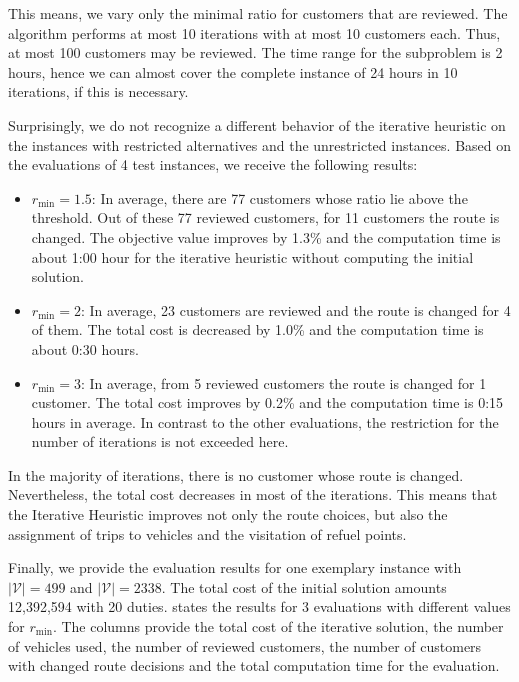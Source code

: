 This means, we vary only the minimal ratio for customers that are reviewed. The algorithm performs at most 10 iterations with at most 10 customers each. Thus, at most 100 customers may be reviewed. The time range for the subproblem is 2 hours, hence we can almost cover the complete instance of 24 hours in 10 iterations, if this is necessary.

Surprisingly, we do not recognize a different behavior of the iterative heuristic on the instances with restricted alternatives and the unrestricted instances. Based on the evaluations of 4 test instances, we receive the following results:
\begin{itemize}
	\item{$r_{\min} = 1.5$:}
In average, there are 77 customers whose ratio lie above the threshold. Out of these 77 reviewed customers, for 11 customers the route is changed. The objective value improves by 1.3\% and the computation time is about 1:00 hour for the iterative heuristic without computing the initial solution.
	\item{$r_{\min} = 2$:}
In average, 23 customers are reviewed and the route is changed for 4 of them. The total cost is decreased by 1.0\% and the computation time is about 0:30 hours.
	\item{$r_{\min} = 3$:}
In average, from 5 reviewed customers the route is changed for 1 customer. The total cost improves by 0.2\% and the computation time is 0:15 hours in average. In contrast to the other evaluations, the restriction for the number of iterations is not exceeded here.
\end{itemize}

In the majority of iterations, there is no customer whose route is changed. Nevertheless, the total cost decreases in most of the iterations. This means that the Iterative Heuristic improves not only the route choices, but also the assignment of trips to vehicles and the visitation of refuel points.

Finally, we provide the evaluation results for one exemplary instance with ${\vert\mathcal{V}\vert=499}$ and ${\vert\mathcal{V}\vert=2338}$. The total cost of the initial solution amounts 12,392,594 with 20 duties.  states the results for 3 evaluations with different values for $r_{\min}$. The columns provide the total cost of the iterative solution, the number of vehicles used, the number of reviewed customers, the number of customers with changed route decisions and the total computation time for the evaluation.

